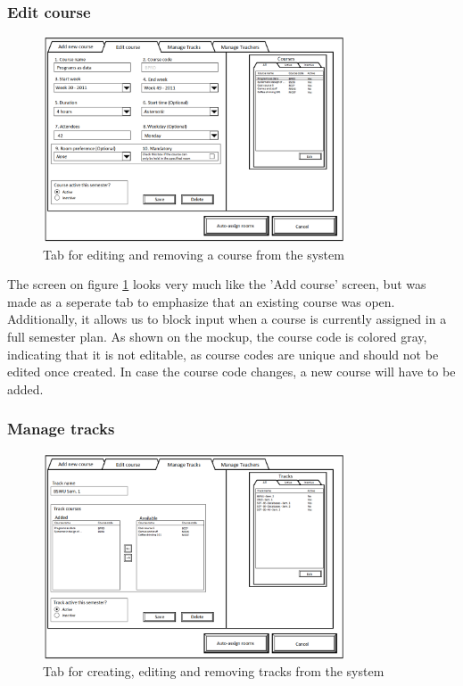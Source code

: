 \subsubsection{Edit course}
\begin{figure}[htb]
\begin{center}
\leavevmode
\includegraphics[width=0.8\textwidth]{images/courseplan2_editcourse}
\end{center}
\caption{Tab for editing and removing a course from the system}
\label{fig:courseplan2_editcourse}
\end{figure}

The screen on figure \ref{fig:courseplan2_editcourse} looks very much like the 'Add course' screen, but was made as a seperate tab to emphasize that an existing course was open. Additionally, it allows us to block input when a course is currently assigned in a full semester plan. As shown on the mockup, the course code is colored gray, indicating that it is not editable, as course codes are unique and should not be edited once created. In case the course code changes, a new course will have to be added.

\subsubsection{Manage tracks}
\begin{figure}[htb]
\begin{center}
\leavevmode
\includegraphics[width=0.8\textwidth]{images/courseplan2_managetracks}
\end{center}
\caption{Tab for creating, editing and removing tracks from the system}
\label{fig:courseplan2_managetracks}
\end{figure}

